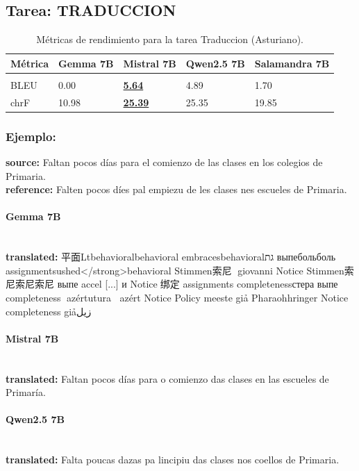 \subsection{Tarea: TRADUCCION}\label{tarea-traduccion}
\begin{longtable}[]{@{}lllll@{}}
\toprule\noalign{}
Métrica & Gemma 7B & Mistral 7B & Qwen2.5 7B & Salamandra 7B \\
\midrule\noalign{}
\endhead
\bottomrule\noalign{}
\caption{Métricas de rendimiento para la tarea Traduccion (Asturiano).}
\label{tab:metricas_traduccion_Asturiano}\\
\endlastfoot
BLEU & 0.00 & \textbf{\underline{5.64}} & 4.89 & 1.70 \\
chrF & 10.98 & \textbf{\underline{25.39}} & 25.35 & 19.85 \\
\end{longtable}

\subsubsection{Ejemplo:}
\textbf{source:} Faltan pocos días para el comienzo de las clases en los colegios de Primaria.\\
\textbf{reference:} Falten pocos díes pal empiezu de les clases nes escueles de Primaria.

\paragraph{Gemma 7B}~\\
\textbf{translated:} 平面Ltbehavioralbehavioral embracesbehavioralגת выпебольболь assignmentsushed{\textless}/strong{\textgreater}behavioral Stimmen索尼🥈 giovanni Notice Stimmen索尼索尼索尼 выпе accel [...] и Notice🥈绑定 assignments completenessстера выпе completeness🥈 azértutura🥈🥈 azért Notice Policy meeste giả Pharaohhringer Notice completeness giảزيل

\paragraph{Mistral 7B}~\\
\textbf{translated:} Faltan pocos días para o comienzo das clases en las escueles de Primaría.

\paragraph{Qwen2.5 7B}~\\
\textbf{translated:} Falta poucas dazas pa l\textquotesingle{}incipiu das clases nos coellos de Primaria.

